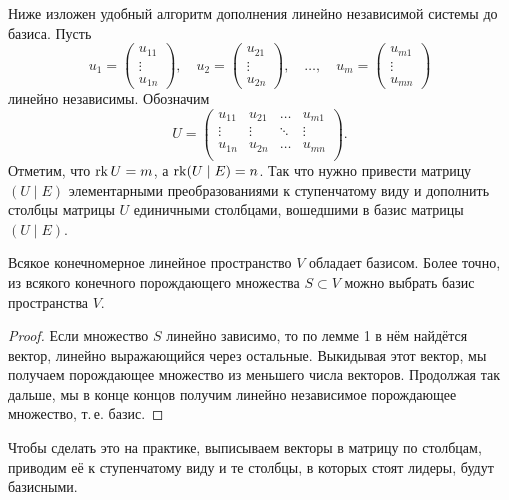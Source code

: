 \begin{remark}
    Ниже изложен удобный алгоритм дополнения линейно независимой системы до базиса. Пусть 
    \[
        u_1 = 
        \begin{pmatrix}
            u_{11}\\
            \vdots\\
            u_{1n}
        \end{pmatrix},\quad
        u_2 = 
        \begin{pmatrix}
            u_{21}\\
            \vdots\\
            u_{2n}
        \end{pmatrix},\quad\ldots,\quad
        u_m = 
        \begin{pmatrix}
            u_{m1}\\
            \vdots\\
            u_{mn}
        \end{pmatrix}
    \] линейно независимы. Обозначим
    \[
        U = 
        \begin{pmatrix}
            u_{11} & u_{21} & \ldots & u_{m1}\\
            \vdots & \vdots & \ddots & \vdots\\
            u_{1n} & u_{2n} & \ldots & u_{mn}\\
        \end{pmatrix}.
    \]
    Отметим, что $\operatorname{rk} U = m$, а $\operatorname{rk}(U \mid E) = n$. Так что нужно привести матрицу $(U \mid E)$ элементарными преобразованиями к ступенчатому виду и дополнить столбцы матрицы $U$ единичными столбцами, вошедшими в базис матрицы $(U \mid E)$.
\end{remark}

\begin{lemma}
    Всякое конечномерное линейное пространство $V$ обладает базисом. Более точно, из всякого конечного порождающего множества $S \subset V$ можно выбрать базис пространства $V$.
\end{lemma}

\begin{proof}
    Если множество $S$ линейно зависимо, то по лемме 1 в нём найдётся вектор, линейно выражающийся через остальные. Выкидывая этот вектор, мы получаем порождающее множество из меньшего числа векторов. Продолжая так дальше, мы в конце концов получим линейно независимое порождающее множество, т.\,е. базис.
\end{proof}

\begin{remark}
    Чтобы сделать это на практике, выписываем векторы в матрицу по столбцам, приводим её к ступенчатому виду и те столбцы, в которых стоят лидеры, будут базисными.
\end{remark}

